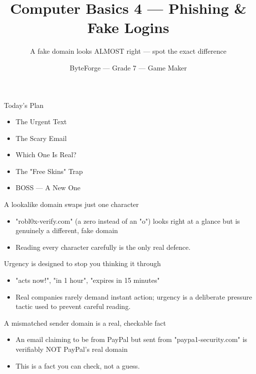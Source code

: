 \documentclass[aspectratio=169]{beamer}
\title{Computer Basics 4 — Phishing \& Fake Logins}
\subtitle{A fake domain looks ALMOST right — spot the exact difference}
\author{ByteForge --- Grade 7 --- Game Maker}
\date{}
\begin{document}
\begin{frame}
    \titlepage
\end{frame}

\begin{frame}{Today's Plan}
    \begin{itemize}
        \item The Urgent Text
        \item The Scary Email
        \item Which One Is Real?
        \item The "Free Skins" Trap
        \item[$\bigstar$] BOSS --- A New One
    \end{itemize}
\end{frame}

\begin{frame}{A lookalike domain swaps just one character}
    \large
    \begin{itemize}
        \item "robl0x-verify.com" (a zero instead of an "o") looks right at a glance but is genuinely a different, fake domain
        \item Reading every character carefully is the only real defence.
    \end{itemize}
\end{frame}


\begin{frame}{Urgency is designed to stop you thinking it through}
    \large
    \begin{itemize}
        \item "acts now!", "in 1 hour", "expires in 15 minutes"
        \item Real companies rarely demand instant action; urgency is a deliberate pressure tactic used to prevent careful reading.
    \end{itemize}
\end{frame}


\begin{frame}{A mismatched sender domain is a real, checkable fact}
    \large
    \begin{itemize}
        \item An email claiming to be from PayPal but sent from "paypa1-security.com" is verifiably NOT PayPal's real domain
        \item This is a fact you can check, not a guess.
    \end{itemize}
\end{frame}
\end{document}

